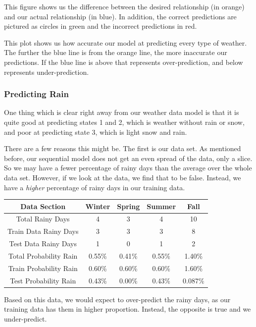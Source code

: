 \documentclass[12pt]{article}
\begin{document}
This figure shows us the difference between the desired relationship (in orange) and our actual relationship (in blue). In addition, the correct predictions are pictured as circles in green and the incorrect predictions in red.

This plot shows us how accurate our model at predicting every type of weather. The further the blue line is from the orange line, the more inaccurate our predictions. If the blue line is above that represents over-prediction, and below represents under-prediction.

\subsubsection{Predicting Rain}
One thing which is clear right away from our weather data model is that it is quite good at predicting states 1 and 2, which is weather without rain or snow, and poor at predicting state 3, which is light snow and rain. 

There are a few reasons this might be. The first is our data set. As mentioned before, our sequential model does not get an even spread of the data, only a slice. So we may have a fewer percentage of rainy days than the average over the whole data set. However, if we look at the data, we find that to be false. Instead, we have a \textit{higher} percentage of rainy days in our training data.

\begin{table}[H]
\centering
 \begin{tabular}{||c | c c c c ||} 
 \hline
 Data Section & Winter & Spring & Summer & Fall \\ [0.5ex] 
 \hline\hline
 Total Rainy Days       & 4 & 3 & 4 & 10 \\ 
 Train Data Rainy Days  & 3 & 3 & 3 & 8 \\
 Test Data Rainy Days   & 1 & 0 & 1 & 2 \\
 Total Probability Rain & 0.55\% & 0.41\% & 0.55\% & 1.40\% \\
 Train Probability Rain & 0.60\% & 0.60\% & 0.60\% & 1.60\% \\
 Test Probability Rain  & 0.43\% & 0.00\% & 0.43\% & 0.087\% \\ [1ex] 
 \hline
 \end{tabular}
\end{table}

Based on this data, we would expect to over-predict the rainy days, as our training data has them in higher proportion. Instead, the opposite is true and we under-predict.
\end{document}
